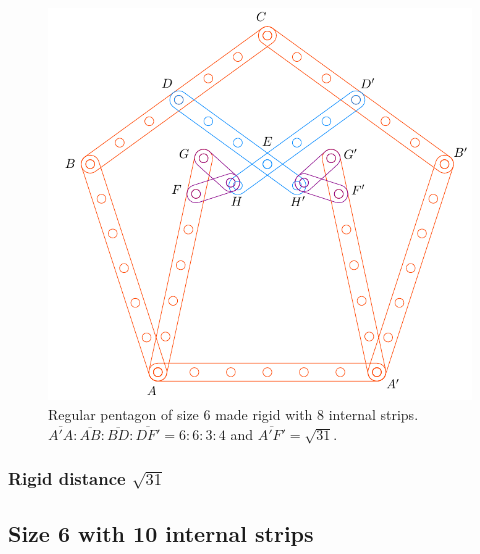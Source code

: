 \documentclass[11pt]{article}
\begin{document}
\begin{figure}[H]
\centering
\includegraphics[scale=0.7]{6/penta6-8a}
\caption{Regular pentagon of size 6 made rigid with 8 internal strips. $\overline{A'A} : \overline{AB} : \overline{BD} : \overline{DF'} = 6:6:3:4$ and $\overline{A'F'} = \sqrt{31}$.}
\label{fig:penta6-6a}
\end{figure}

\subsubsection{Rigid distance $\sqrt{31}$}

\subsection{Size 6 with 10 internal strips}
\end{document}
